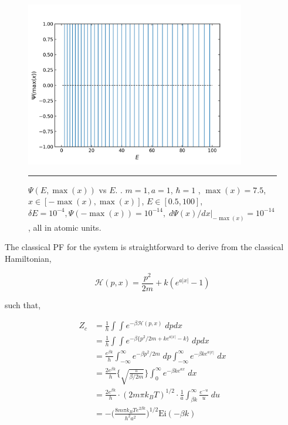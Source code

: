 \documentclass[../main.tex]{subfiles}
\begin{document}
\begin{figure}[h!]
	\centering
	\includegraphics[height=7.2cm]{4/figs/1d_exp_well_psi_max_vs_energy}
	\vspace{0.2cm}
	\hrule
	\caption{$\Psi(E, \max(x))$ vs $E$. . $m=1, a = 1$, $\hbar = 1$ , $\max(x) = 7.5$, $x \in [-\max(x), \max(x)]$, $E \in [0.5, 100]$, $\delta E = 10^{-4}, \Psi(-\!\max(x)) = 10^{-14},\; d\Psi(x)/dx|_{-\!\max(x)} = 10^{-14}$, all in atomic units.} 
	\label{1d_exp_well_psi_max_vs_energy}
\end{figure}
\newpage
The classical PF for the system is straightforward to derive from the classical Hamiltonian,

\begin{equation}
\mathcal{H}(p, x) = \frac{p^2}{2m} + k (e^{a|x|} - 1)
\end{equation} 

such that,

\begin{equation}
\begin{aligned}
Z_c &= \frac{1}{h}\int\int e^{-\beta \mathcal{H}(p, x)} \; dp dx \\
&=  \frac{1}{h}\int\int e^{-\beta \{{p^2}/{2m} + k e^{a|x|} - k\}} \; dp dx \\
&=  \frac{e^{\beta k}}{h}\int_{-\infty}^\infty e^{-\beta {p^2}/{2m}} \;dp \int_{-\infty}^\infty e^{-\beta k e^{a|x|}} \;  dx \\
&=  \frac{2e^{\beta k}}{h} {\Big \{} \sqrt{\frac{\pi}{\beta / 2m}} {\Big \}}  \int_{0}^\infty e^{- \beta k e^{ax}} \;  dx \\
&=  \frac{2e^{\beta k}}{h} \cdot (2m\pi k_B T)^{1/2} \cdot \frac{1}{a} \int_{\beta k}^\infty \frac{e^{-u}}{u} \;  du \\
&=  -{\Big (} \frac{8m\pi k_B Te^{2\beta k}}{h^2a^2} {\Big )}^{1/2}  \text{Ei}(-\beta k)
\end{aligned}
\end{equation}
\end{document}
